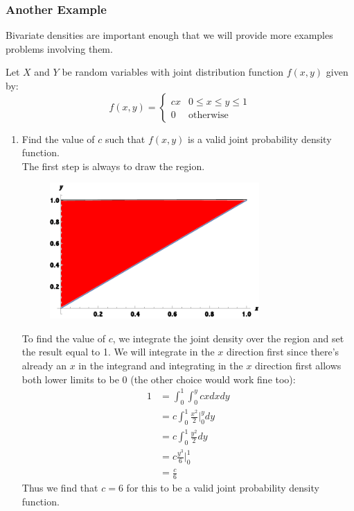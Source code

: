 \documentclass[notes.tex]{subfiles}
\begin{document}
\subsubsection{Another Example}
Bivariate densities are important enough that we will provide more examples problems involving them.

\begin{example}Let $X$ and $Y$ be random variables with joint distribution function $f(x, y)$ given by:
\[
f(x, y) = \begin{cases} 
      c x  & 0 \leq x \leq y \leq 1 \\
      0 & \textrm{otherwise}
   \end{cases}
\]

\begin{enumerate}
\item Find the value of $c$ such that $f(x, y)$ is a valid joint probability density function.\\

The first step is always to draw the region.
\begin{figure}[H]
\centering
\includegraphics[width=8cm]{region2.pdf}
\end{figure}
To find the value of $c$, we integrate the joint density over the region and set the result equal to 1. We will integrate in the $x$ direction first since there's already an $x$ in the integrand and integrating in the $x$ direction first allows both lower limits to be 0 (the other choice would work fine too):
\begin{align*}
1 &= \int_0^1 \int_0^y c x dx dy \\
&= c \int_0^1 \frac{x^2}{2}\Bigr|_0^y dy \\
&= c \int_0^1 \frac{y^2}{2} dy \\
&= c \frac{y^3}{6}\Bigr|_0^1 \\
&= \frac{c}{6}
\end{align*}
Thus we find that $c = 6$ for this to be a valid joint probability density function.


\end{enumerate}
\end{example}
\end{document}
